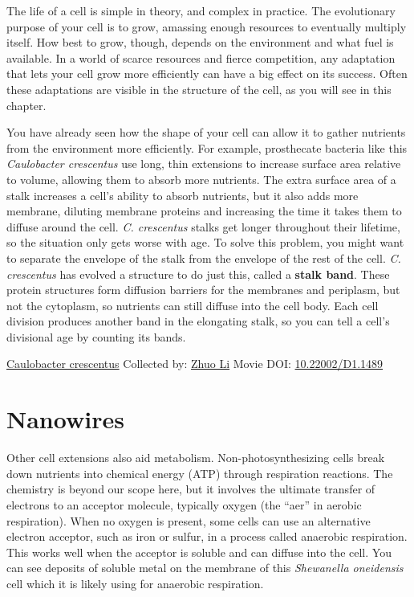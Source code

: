 \documentclass[]{tufte-book}
\begin{document}
The life of a cell is simple in theory, and complex in practice. The evolutionary purpose of your cell is to grow, amassing enough resources to eventually multiply itself. How best to grow, though, depends on the environment and what fuel is available. In a world of scarce resources and fierce competition, any adaptation that lets your cell grow more efficiently can have a big effect on its success. Often these adaptations are visible in the structure of the cell, as you will see in this chapter.

You have already seen how the shape of your cell can allow it to gather nutrients from the environment more efficiently. For example, prosthecate bacteria like this \emph{Caulobacter crescentus} use long, thin extensions to increase surface area relative to volume, allowing them to absorb more nutrients. The extra surface area of a stalk increases a cell's ability to absorb nutrients, but it also adds more membrane, diluting membrane proteins and increasing the time it takes them to diffuse around the cell. \emph{C. crescentus} stalks get longer throughout their lifetime, so the situation only gets worse with age. To solve this problem, you might want to separate the envelope of the stalk from the envelope of the rest of the cell. \emph{C. crescentus} has evolved a structure to do just this, called a \textbf{stalk band}. These protein structures form diffusion barriers for the membranes and periplasm, but not the cytoplasm, so nutrients can still diffuse into the cell body. Each cell division produces another band in the elongating stalk, so you can tell a cell's divisional age by counting its bands.



\hypertarget{htmlwidget-1d3d62714a4ad85f34e7}{}

\label{fig:4-1}\protect\hyperlink{tree}{Caulobacter crescentus} Collected by: \protect\hyperlink{zhuo_li}{Zhuo Li} Movie DOI: \href{https://doi.org/10.22002/D1.1489}{10.22002/D1.1489}

\hypertarget{nanowires}{%
\section{Nanowires}\label{nanowires}}

Other cell extensions also aid metabolism. Non-photosynthesizing cells break down nutrients into chemical energy (ATP) through respiration reactions. The chemistry is beyond our scope here, but it involves the ultimate transfer of electrons to an acceptor molecule, typically oxygen (the ``aer'' in aerobic respiration). When no oxygen is present, some cells can use an alternative electron acceptor, such as iron or sulfur, in a process called anaerobic respiration. This works well when the acceptor is soluble and can diffuse into the cell. You can see deposits of soluble metal on the membrane of this \emph{Shewanella oneidensis} cell which it is likely using for anaerobic respiration.
\end{document}
